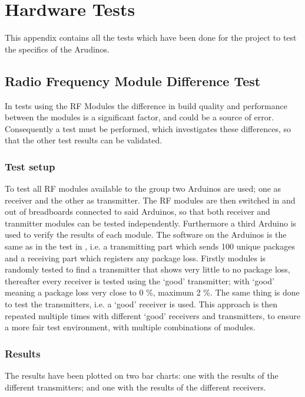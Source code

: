 \chapter{Hardware Tests} %
\label{cha:hardware_tests}
This appendix contains all the tests which have been done for the project to test the specifics of the Arudinos.
\section*{Radio Frequency Module Difference Test}\label{sec:RFMD}
In tests using the RF Modules the difference in build quality and performance between the modules is a significant factor, and could be a source of error.
Consequently a test must be performed, which investigates these differences, so that the other test results can be validated.

\subsection*{Test setup}
To test all RF modules available to the group two Arduinos are used; one as receiver and the other as transmitter.
The RF modules are then switched in and out of breadboards connected to said Arduinos, so that both receiver and tranmitter modules can be tested independently.
Furthermore a third Arduino is used to verify the results of each module.
The software on the Arduinos is the same as in the test in , i.e. a transmitting part which sends 100 unique packages and a receiving part which registers any package loss. 
Firstly modules is randomly tested to find a transmitter that shows very little to no package loss, thereafter every receiver is tested using the \enquote*{good} transmitter; with \enquote*{good} meaning a package loss very close to 0 \%, maximum 2 \%.
The same thing is done to test the transmitters, i.e. a \enquote*{good} receiver is used.
This approach is then repeated multiple times with different \enquote*{good} receivers and transmitters, to ensure a more fair test environment, with multiple combinations of modules.

\subsection*{Results}
The results have been plotted on two bar charts: one with the results of the different transmitters; 
and one with the results of the different receivers.


